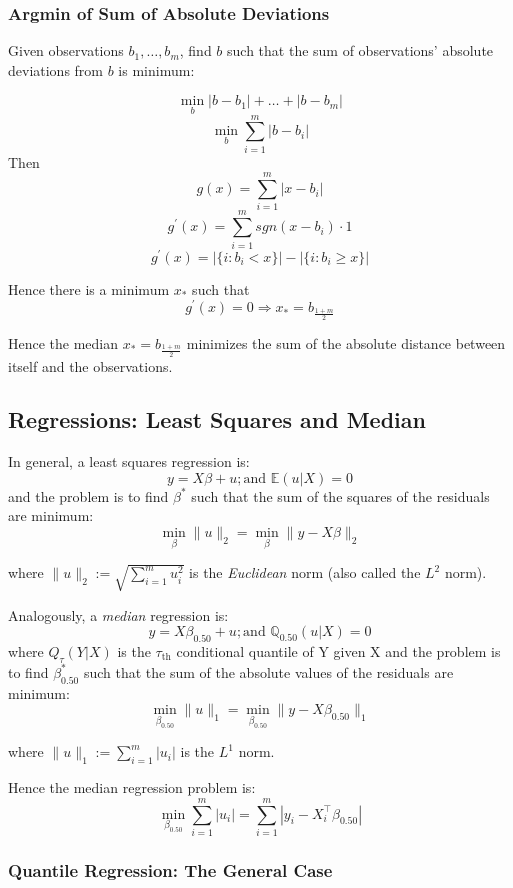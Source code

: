 \documentclass[11pt,]{article}
\begin{document}
\subsubsection{Argmin of Sum of Absolute
Deviations}\label{argmin-of-sum-of-absolute-deviations}

Given observations \(b_1,\hdots,b_m\), find \(b\) such that the sum of
observations' absolute deviations from \(b\) is minimum:

\[\min_b{} |b-b_1|+\hdots+|b-b_m|\] \[\min_b{} \sum_{i=1}^m |b-b_i|\]
Then \[g(x) = \sum_{i=1}^m |x-b_i|\]
\[g^{\prime}(x) = \sum_{i=1}^m sgn(x-b_i)\cdot 1\]
\[g^{\prime}(x) = |\{i: b_i < x\}| - |\{i: b_i \geq x\}| \]

Hence there is a minimum \(x_*\) such that
\[g^{\prime}(x) =  0 \Rightarrow x_* = b_{\frac{1+m}{2}}\]

Hence the median \(x_* = b_{\frac{1+m}{2}}\) minimizes the sum of the
absolute distance between itself and the observations.

\subsection{Regressions: Least Squares and
Median}\label{regressions-least-squares-and-median}

In general, a least squares regression is:
\[y = X\beta+u; \text{and } \mathbb{E}(u|X) = 0\] and the problem is to
find \(\beta^*\) such that the sum of the squares of the residuals are
minimum: \[\min_{\beta}{} \|u\|_2=\min_{\beta}{}\|y-X\beta\|_2\]

where \(\|u\|_2 := \sqrt{\sum_{i=1}^m u_i^2}\) is the \emph{Euclidean}
norm (also called the \(L^2\) norm).

Analogously, a \emph{median} regression is:
\[y = X\beta_{0.50}+u; \text{and } \mathbb{Q}_{0.50}(u|X) = 0\] where
\(Q_{\tau}(Y|X)\) is the \(\tau_{\text{th}}\) conditional quantile of Y
given X and the problem is to find \(\beta_{0.50}^*\) such that the sum
of the absolute values of the residuals are minimum:
\[\min_{\beta_{0.50}}{} \|u\|_1=\min_{\beta_{0.50}}{}\|y-X\beta_{0.50}\|_1\]

where \(\|u\|_1 := \sum_{i=1}^m |u_i|\) is the \(L^1\) norm.

Hence the median regression problem is:
\[\min_{\beta_{0.50}}{} \sum_{i=1}^m |u_i|=\sum_{i=1}^m |y_i-X_i^{\top}\beta_{0.50}|\]

\subsubsection{Quantile Regression: The General
Case}\label{quantile-regression-the-general-case}
\end{document}
